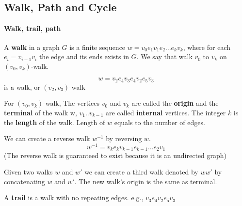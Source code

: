             \subsection{Walk, Path and Cycle}
                \paragraph{Walk, trail, path}
                    \begin{definition}[walk]
                        A \textbf{walk} in a graph $G$ is a finite sequence $w=v_0e_1v_1e_2...e_kv_k$, where for each $e_i=v_{i-1}v_i$ the edge and its ends exists in $G$. We say that walk $v_0$ to $v_k$ on $(v_0, v_k)$-walk.
                    \end{definition}

                    \begin{example}
                        \begin{equation*}
                            w = v_2e_4v_3e_4v_2e_5v_3
                        \end{equation*}
                        is a walk, or $(v_2, v_3)$-walk
                    \end{example}

                    \begin{definition}
                        For $(v_0, v_k)$-walk, The vertices $v_0$ and $v_k$ are called the \textbf{origin} and the \textbf{terminal} of the walk w, $v_1..v_{k-1}$ are called \textbf{internal} vertices. The integer $k$ is the \textbf{length} of the walk. Length of $w$ equals to the number of edges.
                    \end{definition}

                    We can create a reverse walk $w^{-1}$ by reversing $w$.
                    \begin{equation*}
                        w^{-1} = v_ke_kv_{k-1}e_{k-1}...e_2v_1
                    \end{equation*}
                    (The reverse walk is guaranteed to exist because it is an undirected graph)

                    Given two walks $w$ and $w'$ we can create a third walk denoted by $ww'$ by concatenating $w$ and $w'$. The new walk's origin is the same as terminal.

                    \begin{definition}[trail]
                        A \textbf{trail} is a walk with no repeating edges. e.g., $v_3e_4v_2e_5v_3$
                    \end{definition}

